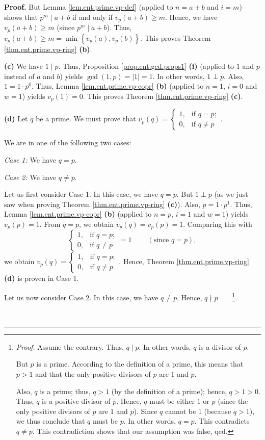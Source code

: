 \documentclass[numbers=enddot,12pt,final,onecolumn,notitlepage]{scrartcl}%
\numberwithin{exer}{subsection}
\theoremstyle{definition}
\newenvironment{proof}[1][Proof]{\noindent\textbf{#1.} }{\ \rule{0.5em}{0.5em}}
\begin{document}
\begin{proof}
But Lemma \ref{lem.ent.prime.vp-def} (applied to $n=a+b$ and $i=m$) shows that
$p^{m}\mid a+b$ if and only if $v_{p}\left(  a+b\right)  \geq m$. Hence, we
have $v_{p}\left(  a+b\right)  \geq m$ (since $p^{m}\mid a+b$). Thus,
$v_{p}\left(  a+b\right)  \geq m=\min\left\{  v_{p}\left(  a\right)
,v_{p}\left(  b\right)  \right\}  $. This proves Theorem
\ref{thm.ent.prime.vp-ring} \textbf{(b)}.

\textbf{(c)} We have $1\mid p$. Thus, Proposition \ref{prop.ent.gcd.props1}
\textbf{(i)} (applied to $1$ and $p$ instead of $a$ and $b$) yields
$\gcd\left(  1,p\right)  =\left\vert 1\right\vert =1$. In other words, $1\perp
p$. Also, $1=1\cdot p^{0}$. Thus, Lemma \ref{lem.ent.prime.vp-copr}
\textbf{(b)} (applied to $n=1$, $i=0$ and $w=1$) yields $v_{p}\left(
1\right)  =0$. This proves Theorem \ref{thm.ent.prime.vp-ring} \textbf{(c)}.

\textbf{(d)} Let $q$ be a prime. We must prove that $v_{p}\left(  q\right)  =%
\begin{cases}
1, & \text{if }q=p;\\
0, & \text{if }q\neq p
\end{cases}
$.

We are in one of the following two cases:

\textit{Case 1:} We have $q=p$.

\textit{Case 2:} We have $q\neq p$.

Let us first consider Case 1. In this case, we have $q=p$. But $1\perp p$ (as
we just saw when proving Theorem \ref{thm.ent.prime.vp-ring} \textbf{(c)}).
Also, $p=1\cdot p^{1}$. Thus, Lemma \ref{lem.ent.prime.vp-copr} \textbf{(b)}
(applied to $n=p$, $i=1$ and $w=1$) yields $v_{p}\left(  p\right)  =1$. From
$q=p$, we obtain $v_{p}\left(  q\right)  =v_{p}\left(  p\right)  =1$.
Comparing this with
\[%
\begin{cases}
1, & \text{if }q=p;\\
0, & \text{if }q\neq p
\end{cases}
=1\ \ \ \ \ \ \ \ \ \ \left(  \text{since }q=p\right)  ,
\]
we obtain $v_{p}\left(  q\right)  =%
\begin{cases}
1, & \text{if }q=p;\\
0, & \text{if }q\neq p
\end{cases}
$. Hence, Theorem \ref{thm.ent.prime.vp-ring} \textbf{(d)} is proven in Case 1.

Let us now consider Case 2. In this case, we have $q\neq p$. Hence, $q\nmid
p$\ \ \ \ \footnote{\textit{Proof.} Assume the contrary. Thus, $q\mid p$. In
other words, $q$ is a divisor of $p$.
\par
But $p$ is a prime. According to the definition of a prime, this means that
$p>1$ and that the only positive divisors of $p$ are $1$ and $p$.
\par
Also, $q$ is a prime; thus, $q>1$ (by the definition of a prime); hence,
$q>1>0$. Thus, $q$ is a positive divisor of $p$. Hence, $q$ must be either $1$
or $p$ (since the only positive divisors of $p$ are $1$ and $p$). Since $q$
cannot be $1$ (because $q>1$), we thus conclude that $q$ must be $p$. In other
words, $q=p$. This contradicts $q\neq p$. This contradiction shows that our
assumption was false, qed.}.


\end{proof}
\end{document}
